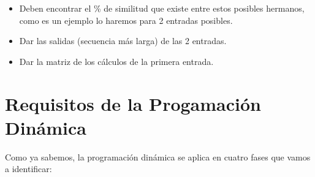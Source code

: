 \documentclass[10pt,a4paper]{article}
\begin{document}
\begin{itemize}
	\item Deben encontrar el \% de similitud que existe entre estos posibles hermanos, como es un ejemplo lo haremos para 2 entradas posibles.
	\item Dar las salidas (secuencia más larga) de las 2 entradas.
	\item Dar la matriz de los cálculos de la primera entrada.
\end{itemize}

\section{Requisitos de la Progamación Dinámica}
Como ya sabemos, la programación dinámica se aplica en cuatro fases que vamos a identificar:
\end{document}
